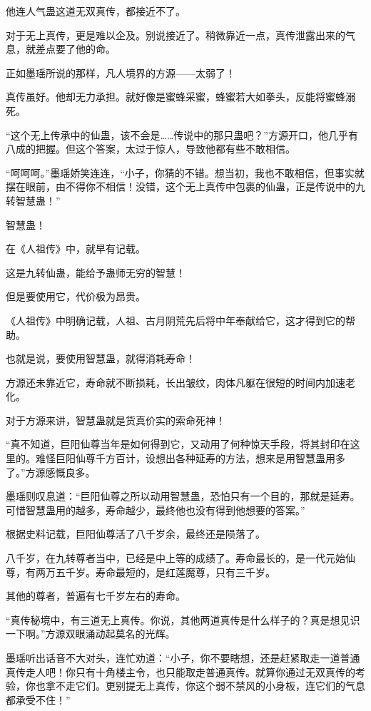 \begin{this_body}
他连人气蛊这道无双真传，都接近不了。

对于无上真传，更是难以企及。别说接近了。稍微靠近一点，真传泄露出来的气息，就差点要了他的命。

正如墨瑶所说的那样，凡人境界的方源——太弱了！

真传虽好。他却无力承担。就好像是蜜蜂采蜜，蜂蜜若大如拳头，反能将蜜蜂溺死。

“这个无上传承中的仙蛊，该不会是……传说中的那只蛊吧？”方源开口，他几乎有八成的把握。但这个答案，太过于惊人，导致他都有些不敢相信。

“呵呵呵。”墨瑶娇笑连连，“小子，你猜的不错。想当初，我也不敢相信，但事实就摆在眼前，由不得你不相信！没错，这个无上真传中包裹的仙蛊，正是传说中的九转智慧蛊！”

智慧蛊！

在《人祖传》中，就早有记载。

这是九转仙蛊，能给予蛊师无穷的智慧！

但是要使用它，代价极为昂贵。

《人祖传》中明确记载，人祖、古月阴荒先后将中年奉献给它，这才得到它的帮助。

也就是说，要使用智慧蛊，就得消耗寿命！

方源还未靠近它，寿命就不断损耗，长出皱纹，肉体凡躯在很短的时间内加速老化。

对于方源来讲，智慧蛊就是货真价实的索命死神！

“真不知道，巨阳仙尊当年是如何得到它，又动用了何种惊天手段，将其封印在这里的。难怪巨阳仙尊千方百计，设想出各种延寿的方法，想来是用智慧蛊用多了。”方源感慨良多。

墨瑶则叹息道：“巨阳仙尊之所以动用智慧蛊，恐怕只有一个目的，那就是延寿。可惜智慧蛊用的越多，寿命越少，最终他也没有得到他想要的答案。”

根据史料记载，巨阳仙尊活了八千岁余，最终还是陨落了。

八千岁，在九转尊者当中，已经是中上等的成绩了。寿命最长的，是一代元始仙尊，有两万五千岁。寿命最短的，是红莲魔尊，只有三千岁。

其他的尊者，普遍有七千岁左右的寿命。

“真传秘境中，有三道无上真传。你说，其他两道真传是什么样子的？真是想见识一下啊。”方源双眼涌动起莫名的光辉。

墨瑶听出话音不大对头，连忙劝道：“小子，你不要瞎想，还是赶紧取走一道普通真传走人吧！你只有十角楼主令，也只能取走普通真传。就算你通过无双真传的考验，你也拿不走它们。更别提无上真传，你这个弱不禁风的小身板，连它们的气息都承受不住！”


\end{this_body}
